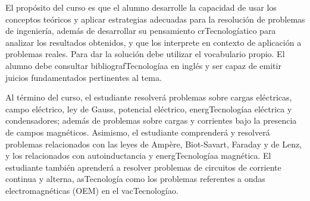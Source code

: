 \begin{syllabus}


\begin{justification}
El propósito del curso es que el alumno desarrolle la capacidad de usar los conceptos teóricos y aplicar estrategias adecuadas para la resolución de problemas de ingeniería, además de desarrollar su pensamiento crTecnologíatico para analizar los resultados obtenidos, y que los interprete en contexto de aplicación a problemas reales. Para dar la solución debe utilizar el vocabulario propio. El alumno debe consultar bibliografTecnologíaa en inglés y ser capaz de emitir juicios fundamentados pertinentes al tema. 
\end{justification}

\begin{goals}
\item Al término del curso, el estudiante resolverá problemas sobre cargas eléctricas, campo eléctrico, ley de Gauss, potencial eléctrico, energTecnologíaa eléctrica y condensadores; además de problemas sobre cargas y corrientes bajo la presencia de campos magnéticos. Asimismo, el estudiante comprenderá y resolverá problemas relacionados con las leyes de Ampère, Biot-Savart, Faraday y de Lenz, y los relacionados con autoinductancia y energTecnologíaa magnética. El estudiante también aprenderá a resolver problemas de circuitos de corriente continua y alterna, asTecnología como los problemas referentes a ondas electromagnéticas (OEM) en el vacTecnologíao.
\end{goals}

\begin{outcomes}
\item {}
\item {}
\end{outcomes}

\begin{competences}
    \item {}
\end{competences}


\end{syllabus}
